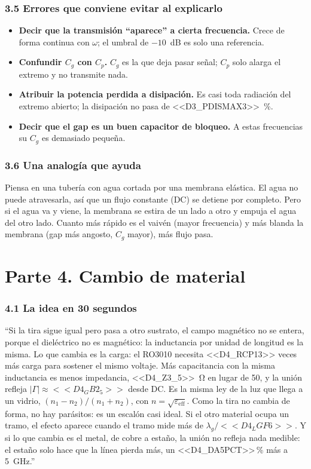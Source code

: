 \documentclass[11pt,letterpaper]{article}
\begin{document}
\section*{3.5 Errores que conviene evitar al explicarlo}
\begin{itemize}
\item \textbf{Decir que la transmisión ``aparece'' a cierta frecuencia.} Crece de forma continua con $\omega$; el umbral de $-10$~dB es solo una referencia.
\item \textbf{Confundir $C_g$ con $C_p$.} $C_g$ es la que deja pasar señal; $C_p$ solo alarga el extremo y no transmite nada.
\item \textbf{Atribuir la potencia perdida a disipación.} Es casi toda radiación del extremo abierto; la disipación no pasa de \SI{<<D3_PDISMAX3>>}{\percent}.
\item \textbf{Decir que el gap es un buen capacitor de bloqueo.} A estas frecuencias su $C_g$ es demasiado pequeña.
\end{itemize}

\section*{3.6 Una analogía que ayuda}
Piensa en una tubería con agua cortada por una membrana elástica. El agua no puede atravesarla, así que un flujo constante (DC) se detiene por completo. Pero si el agua va y viene, la membrana se estira de un lado a otro y empuja el agua del otro lado. Cuanto más rápido es el vaivén (mayor frecuencia) y más blanda la membrana (gap más angosto, $C_g$ mayor), más flujo pasa.

\part*{Parte 4. Cambio de material}

\section*{4.1 La idea en 30 segundos}
\begin{idea}
``Si la tira sigue igual pero pasa a otro sustrato, el campo magnético no se entera, porque el dieléctrico no es magnético: la inductancia por unidad de longitud es la misma. Lo que cambia es la carga: el RO3010 necesita <<D4_RCP13>> veces más carga para sostener el mismo voltaje. Más capacitancia con la misma inductancia es menos impedancia, \SI{<<D4_Z3_5>>}{\ohm} en lugar de 50, y la unión refleja $|\Gamma|\approx<<D4_GB2_5>>$ desde DC. Es la misma ley de la luz que llega a un vidrio, $(n_1-n_2)/(n_1+n_2)$, con $n=\sqrt{\varepsilon_{\mathrm{eff}}}$. Como la tira no cambia de forma, no hay parásitos: es un escalón casi ideal. Si el otro material ocupa un tramo, el efecto aparece cuando el tramo mide más de $\lambda_g/<<D4_LGF6>>$. Y si lo que cambia es el metal, de cobre a estaño, la unión no refleja nada medible: el estaño solo hace que la línea pierda más, un <<D4_DA5PCT>>\,\% más a \SI{5}{GHz}.''
\end{idea}
\end{document}
